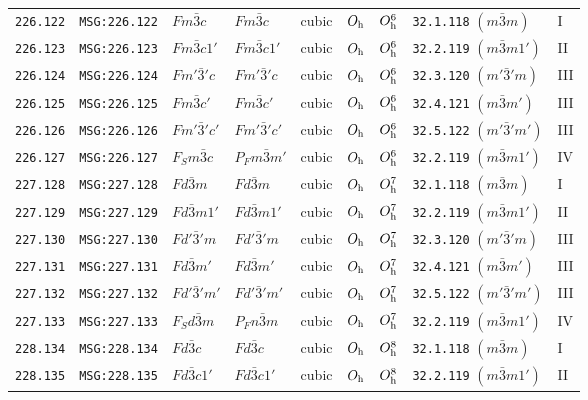 \documentclass[fleqn,10pt]{jsarticle}
\begin{document}
\begin{center}
\begin{longtable}{lllllllll}
\texttt{226.122} & \texttt{MSG:226.122} & $Fm\bar{3}c$ & $Fm\bar{3}c$ & cubic & $O_{\rm h}$ & $O_{\rm h}^{6}$ & \texttt{32.1.118} $(m\bar{3}m)$ & I \\
\texttt{226.123} & \texttt{MSG:226.123} & $Fm\bar{3}c1'$ & $Fm\bar{3}c1'$ & cubic & $O_{\rm h}$ & $O_{\rm h}^{6}$ & \texttt{32.2.119} $(m\bar{3}m1')$ & II \\
\texttt{226.124} & \texttt{MSG:226.124} & $Fm'\bar{3}'c$ & $Fm'\bar{3}'c$ & cubic & $O_{\rm h}$ & $O_{\rm h}^{6}$ & \texttt{32.3.120} $(m'\bar{3}'m)$ & III \\
\texttt{226.125} & \texttt{MSG:226.125} & $Fm\bar{3}c'$ & $Fm\bar{3}c'$ & cubic & $O_{\rm h}$ & $O_{\rm h}^{6}$ & \texttt{32.4.121} $(m\bar{3}m')$ & III \\
\texttt{226.126} & \texttt{MSG:226.126} & $Fm'\bar{3}'c'$ & $Fm'\bar{3}'c'$ & cubic & $O_{\rm h}$ & $O_{\rm h}^{6}$ & \texttt{32.5.122} $(m'\bar{3}'m')$ & III \\
\texttt{226.127} & \texttt{MSG:226.127} & $F_{S}m\bar{3}c$ & $P_{F}m\bar{3}m'$ & cubic & $O_{\rm h}$ & $O_{\rm h}^{6}$ & \texttt{32.2.119} $(m\bar{3}m1')$ & IV \\ \hline
\texttt{227.128} & \texttt{MSG:227.128} & $Fd\bar{3}m$ & $Fd\bar{3}m$ & cubic & $O_{\rm h}$ & $O_{\rm h}^{7}$ & \texttt{32.1.118} $(m\bar{3}m)$ & I \\
\texttt{227.129} & \texttt{MSG:227.129} & $Fd\bar{3}m1'$ & $Fd\bar{3}m1'$ & cubic & $O_{\rm h}$ & $O_{\rm h}^{7}$ & \texttt{32.2.119} $(m\bar{3}m1')$ & II \\
\texttt{227.130} & \texttt{MSG:227.130} & $Fd'\bar{3}'m$ & $Fd'\bar{3}'m$ & cubic & $O_{\rm h}$ & $O_{\rm h}^{7}$ & \texttt{32.3.120} $(m'\bar{3}'m)$ & III \\
\texttt{227.131} & \texttt{MSG:227.131} & $Fd\bar{3}m'$ & $Fd\bar{3}m'$ & cubic & $O_{\rm h}$ & $O_{\rm h}^{7}$ & \texttt{32.4.121} $(m\bar{3}m')$ & III \\
\texttt{227.132} & \texttt{MSG:227.132} & $Fd'\bar{3}'m'$ & $Fd'\bar{3}'m'$ & cubic & $O_{\rm h}$ & $O_{\rm h}^{7}$ & \texttt{32.5.122} $(m'\bar{3}'m')$ & III \\
\texttt{227.133} & \texttt{MSG:227.133} & $F_{S}d\bar{3}m$ & $P_{F}n\bar{3}m$ & cubic & $O_{\rm h}$ & $O_{\rm h}^{7}$ & \texttt{32.2.119} $(m\bar{3}m1')$ & IV \\ \hline
\texttt{228.134} & \texttt{MSG:228.134} & $Fd\bar{3}c$ & $Fd\bar{3}c$ & cubic & $O_{\rm h}$ & $O_{\rm h}^{8}$ & \texttt{32.1.118} $(m\bar{3}m)$ & I \\
\texttt{228.135} & \texttt{MSG:228.135} & $Fd\bar{3}c1'$ & $Fd\bar{3}c1'$ & cubic & $O_{\rm h}$ & $O_{\rm h}^{8}$ & \texttt{32.2.119} $(m\bar{3}m1')$ & II \\

\end{longtable}
\end{center}
\end{document}
